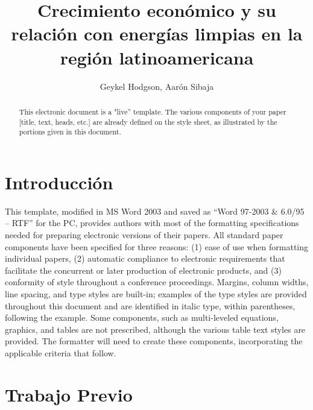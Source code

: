 \documentclass[letterpaper, 12 pt, conference]{ieeeconf}  %
\title{\LARGE \bf
Crecimiento económico y su relación con energías limpias en la región latinoamericana
}
\author{Geykel Hodgson, Aarón Sibaja }
\begin{document}
\maketitle
\thispagestyle{empty}
\pagestyle{empty}


\begin{abstract}

This electronic document is a "live'' template. The various components of your paper [title, text, heads, etc.] are already defined on the style sheet, as illustrated by the portions given in this document.

\end{abstract}


\section{Introducción}

This template, modified \cite{noauthor_why_2014} in MS Word 2003 and saved as ``Word 97-2003 \& 6.0/95 -- RTF'' for the PC, provides authors with most of the formatting specifications needed for preparing electronic versions of their papers. All standard paper components have been specified for three reasons: (1) ease of use when formatting individual papers, (2) automatic compliance to electronic requirements that facilitate the concurrent or later production of electronic products, and (3) conformity of style throughout a conference proceedings. Margins, column widths, line spacing, and type styles are built-in; examples of the type styles are provided throughout this document and are identified in italic type, within parentheses, following the example. Some components, such as multi-leveled equations, graphics, and tables are not prescribed, although the various table text styles are provided. The formatter will need to create these components, incorporating the applicable criteria that follow.



\section{Trabajo Previo}
\end{document}
